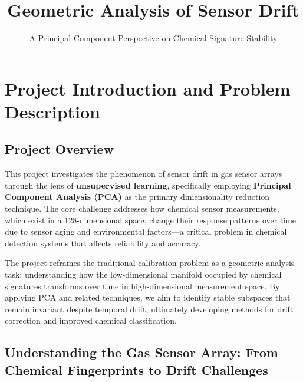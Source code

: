 \documentclass[
  letterpaper,
  DIV=11,
  numbers=noendperiod]{scrartcl}
\title{Geometric Analysis of Sensor Drift}
\subtitle{A Principal Component Perspective on Chemical Signature
Stability}
\author{}
\date{}
\renewcommand*\contentsname{Table of contents}
\newcommand\contentsname{Table of contents}
\begin{document}
\maketitle

\renewcommand*\contentsname{Table of contents}
{
\hypersetup{linkcolor=}
\setcounter{tocdepth}{3}
\tableofcontents
}

\section{Project Introduction and Problem
Description}\label{project-introduction-and-problem-description}

\subsection{Project Overview}\label{project-overview}

This project investigates the phenomenon of sensor drift in gas sensor
arrays through the lens of \textbf{unsupervised learning}, specifically
employing \textbf{Principal Component Analysis (PCA)} as the primary
dimensionality reduction technique. The core challenge addresses how
chemical sensor measurements, which exist in a 128-dimensional space,
change their response patterns over time due to sensor aging and
environmental factors---a critical problem in chemical detection systems
that affects reliability and accuracy.

The project reframes the traditional calibration problem as a geometric
analysis task: understanding how the low-dimensional manifold occupied
by chemical signatures transforms over time in high-dimensional
measurement space. By applying PCA and related techniques, we aim to
identify stable subspaces that remain invariant despite temporal drift,
ultimately developing methods for drift correction and improved chemical
classification.

\subsection{Understanding the Gas Sensor Array: From Chemical
Fingerprints to Drift
Challenges}\label{understanding-the-gas-sensor-array-from-chemical-fingerprints-to-drift-challenges}
\end{document}
